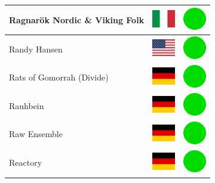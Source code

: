 \documentclass[12pt, a4paper, twoside]{report}
\begin{document}
\begin{center}
\begin{longtable}{|p{5cm}|p{2cm}|p{2cm}|}
Ragnarök Nordic \& Viking Folk & \includegraphics[width=1cm]{4x3/it} & \includegraphics[width=1cm]{likes/y} \\ \hline
Randy Hansen & \includegraphics[width=1cm]{4x3/us} & \includegraphics[width=1cm]{likes/y} \\ \hline
Rats of Gomorrah (Divide) & \includegraphics[width=1cm]{4x3/de} & \includegraphics[width=1cm]{likes/y} \\ \hline
Rauhbein & \includegraphics[width=1cm]{4x3/de} & \includegraphics[width=1cm]{likes/y} \\ \hline
Raw Ensemble & \includegraphics[width=1cm]{4x3/de} & \includegraphics[width=1cm]{likes/y} \\ \hline
Reactory & \includegraphics[width=1cm]{4x3/de} & \includegraphics[width=1cm]{likes/y} \\ \hline

\end{longtable}
\end{center}
\end{document}
